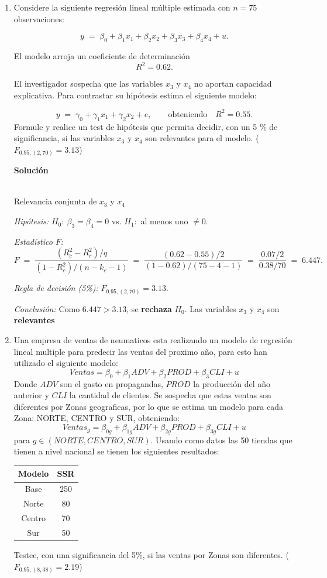 \documentclass[10pt,a4paper]{article}
\begin{document}
\begin{enumerate}
\item Considere la siguiente regresión lineal múltiple estimada con \(n = 75\) observaciones:

\[
y \;=\; \beta_{0} + \beta_{1}x_{1} + \beta_{2}x_{2} + \beta_{3}x_{3} + \beta_{4}x_{4} + u.
\]

El modelo arroja un coeficiente de determinación
\[
R^2 = 0.62.
\]

El investigador sospecha que las variables \(x_{3}\) y \(x_{4}\) no aportan capacidad explicativa.  
Para contrastar su hipótesis estima el siguiente modelo:

\[
y \;=\; \gamma_{0} + \gamma_{1}x_{1} + \gamma_{2}x_{2} + e,
\qquad\text{obteniendo}\quad
R^2 = 0.55.
\]
Formule y realice un test de hipótesis que permita decidir, con un 5 \% de significancia, si las variables \(x_{3}\) y \(x_{4}\) son relevantes para el modelo. ($F_{0.95,(2,70)}=3.13$)

\textbf{Solución}

\\
{Relevancia conjunta de $x_3$ y $x_4$}

\textit{Hipótesis:}\quad
$H_0:\ \beta_3=\beta_4=0$ \quad vs. \quad $H_1:$ al menos uno $\neq 0$.

\textit{Estadístico $F$:}
\[
F \;=\; \frac{(R_c^2-R_r^2)/q}{(1-R_c^2)/(n-k_c-1)}
\;=\;
\frac{(0.62-0.55)/2}{(1-0.62)/(75-4-1)}
\;=\;
\frac{0.07/2}{0.38/70}
\;=\; 6.447.
\]

\textit{Regla de decisión (5\%):}\quad
$F_{0.95,(2,70)}=3.13$.

\textit{Conclusión:}\quad
Como $6.447>3.13$, se \textbf{rechaza} $H_0$. Las variables $x_3$ y $x_4$ son \textbf{relevantes}

\item Una empresa de ventas de neumaticos esta realizando un modelo de regresión lineal multiple para predecir las ventas del proximo año, para esto han utilizado el siguiente modelo:
$$Ventas = \beta_0 + \beta_1ADV + \beta_2PROD+\beta_3CLI + u$$
Donde $ADV$ son el gasto en propagandas, $PROD$ la producción del año anterior y $CLI$ la cantidad de clientes. Se sospecha que estas ventas son diferentes por Zonas geograficas, por lo que se estima un modelo para cada Zona: NORTE, CENTRO y SUR, obteniendo: 
$$Ventas_{g} = \beta_{0g} + \beta_{1g}ADV + \beta_{2g}PROD+\beta_{3g}CLI + u$$
para $g \in {(NORTE,CENTRO,SUR)}$. Usando como datos las 50 tiendas que tienen a nivel nacional se tienen los siguientes resultados:
\begin{center}
    \begin{tabular}{|c|c|}
    \hline
        Modelo & SSR \\
        \hline
        Base & 250 \\
        \hline
        Norte & 80 \\
        \hline
        Centro & 70 \\
        \hline
        Sur & 50 \\
        \hline
    \end{tabular}
\end{center}
Testee, con una significancia del 5\%, si las ventas por Zonas son diferentes. ($F_{0.95,(8,38)}=2.19$)


\end{enumerate}
\end{document}
